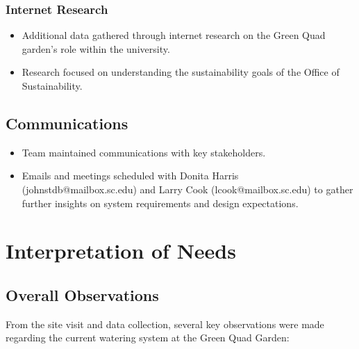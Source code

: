 \documentclass[11pt]{article}
\begin{document}
\subsubsection{Internet Research}
\begin{itemize}
    \item Additional data gathered through internet research on the Green Quad garden’s role within the university.
    \item Research focused on understanding the sustainability goals of the Office of Sustainability.
\end{itemize}

\subsection{Communications}
\begin{itemize}
    \item Team maintained communications with key stakeholders.
    \item Emails and meetings scheduled with Donita Harris (johnstdb@mailbox.sc.edu) and Larry Cook (lcook@mailbox.sc.edu) to gather further insights on system requirements and design expectations.
\end{itemize}


\newpage
\section{Interpretation of Needs}

\subsection{Overall Observations}

From the site visit and data collection, several key observations were made regarding the current watering system at the Green Quad Garden:
\end{document}

